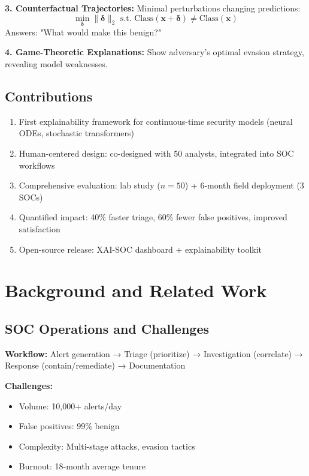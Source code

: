 \documentclass[letterpaper,twocolumn,10pt]{article}
\begin{document}
\textbf{3. Counterfactual Trajectories:} Minimal perturbations changing predictions:
\begin{equation}
\min_{\boldsymbol{\delta}} \|\boldsymbol{\delta}\|_2 \text{ s.t. } \text{Class}(\mathbf{x} + \boldsymbol{\delta}) \neq \text{Class}(\mathbf{x})
\end{equation}
Answers: "What would make this benign?"

\textbf{4. Game-Theoretic Explanations:} Show adversary's optimal evasion strategy, revealing model weaknesses.

\subsection{Contributions}
\begin{enumerate}
\item First explainability framework for continuous-time security models (neural ODEs, stochastic transformers)
\item Human-centered design: co-designed with 50 analysts, integrated into SOC workflows
\item Comprehensive evaluation: lab study ($n=50$) + 6-month field deployment (3 SOCs)
\item Quantified impact: 40\% faster triage, 60\% fewer false positives, improved satisfaction
\item Open-source release: XAI-SOC dashboard + explainability toolkit
\end{enumerate}

\section{Background and Related Work}

\subsection{SOC Operations and Challenges}
\textbf{Workflow:} Alert generation → Triage (prioritize) → Investigation (correlate) → Response (contain/remediate) → Documentation

\textbf{Challenges:}
\begin{itemize}
\item Volume: 10,000+ alerts/day
\item False positives: 99\% benign
\item Complexity: Multi-stage attacks, evasion tactics
\item Burnout: 18-month average tenure
\end{itemize}
\end{document}
